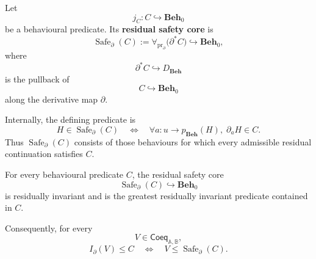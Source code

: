 \begin{definition}
\label{def:residual-safety-core}
    Let
    \[
        j_C:C\hookrightarrow\mathbf{Beh}_0
    \]
    be a behavioural predicate. Its \textbf{residual safety core} is
    \[
        \operatorname{Safe}_\partial(C)
        :=
        \forall_{\operatorname{pr}_{\partial}}
        \bigl(
            \partial^*C
        \bigr)
        \hookrightarrow
        \mathbf{Beh}_0,
    \]
    where
    \[
        \partial^*C\hookrightarrow D_{\mathbf{Beh}}
    \]
    is the pullback of
    \[
        C\hookrightarrow\mathbf{Beh}_0
    \]
    along the derivative map \(\partial\).
\end{definition}

Internally, the defining predicate is
\[
    H\in\operatorname{Safe}_\partial(C)
    \quad\Longleftrightarrow\quad
    \forall a:u\to p_{\mathbf{Beh}}(H),\;
    \partial_aH\in C.
\]
Thus \(\operatorname{Safe}_\partial(C)\) consists of those behaviours for
which every admissible residual continuation satisfies \(C\).

\begin{proposition}
\label{prop:residual-safety-core}
    For every behavioural predicate \(C\), the residual safety core
    \[
        \operatorname{Safe}_\partial(C)
        \hookrightarrow
        \mathbf{Beh}_0
    \]
    is residually invariant and is the greatest residually invariant
    predicate contained in \(C\).

    Consequently, for every
    \[
        V\in\mathsf{Coeq}_{\mathbb A,\mathbb B},
    \]
    \[
        I_\partial(V)\leq C
        \quad\Longleftrightarrow\quad
        V\leq\operatorname{Safe}_\partial(C).
    \]
\end{proposition}

